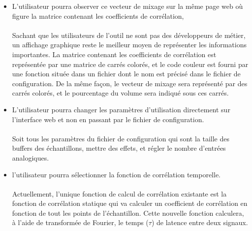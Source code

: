 \documentclass{article}
\begin{document}
\begin{itemize}
	      \paragraph{}

	\item L'utilisateur pourra observer ce vecteur de mixage sur la même page
	      web où figure la matrice contenant les coefficients de corrélation,
	      \paragraph{}
	      Sachant que les utilisateurs de l'outil ne sont pas des développeurs de
	      métier, un affichage graphique reste le meilleur moyen de représenter les
	      informations importantes. La matrice contenant les coefficients de
	      corrélation est représentée par une matrice de carrés colorés, et le
	      code couleur est fourni par une fonction située dans un fichier dont le
	      nom est précisé dans le fichier de configuration. De la même façon, le
	      vecteur de mixage sera représenté par des carrés colorés, et le
	      pourcentage du volume sera indiqué sous ces carrés.\\

	\item L'utilisateur pourra changer les paramètres d'utilisation directement sur
	      l'interface web et non en passant par le fichier de configuration.
	      \paragraph{}
	      Soit tous les paramètres du fichier de configuration qui sont la taille des buffers
	      des échantillons, mettre des effets, et régler le nombre d'entrées analogiques.

	\item l'utilisateur pourra sélectionner la fonction de corrélation temporelle.
	      \paragraph{}
	      Actuellement, l'unique fonction de calcul de corrélation existante est
	      la fonction de corrélation statique qui va calculer un coefficient de corrélation
	      en fonction de tout les points de l’échantillon. Cette nouvelle fonction
	      calculera, à l'aide de transformée de Fourier, le temps ($\tau$) de latence
	      entre deux signaux.


\end{itemize}
\end{document}
